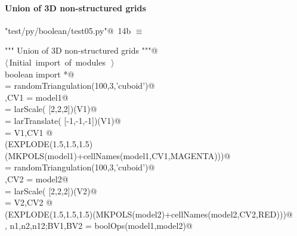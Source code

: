 \documentclass[11pt,oneside]{article}	%
\begin{document}
\paragraph{Union of 3D non-structured grids}

\begin{flushleft} \small
\begin{minipage}{\linewidth} \label{scrap23}
\protect{}\verb@"test/py/boolean/test05.py"@\nobreak\ {\footnotesize 14b }$\equiv$
\vspace{-1ex}
\begin{list}{}{} \item
\mbox{}\verb@""" Union of 3D non-structured grids """@\\
\mbox{}\verb@@\hbox{$\langle\,$Initial import of modules\nobreak\ {\footnotesize {}}$\,\rangle$}\verb@@\\
\mbox{}\verb@from boolean import *@\\
\mbox{} = randomTriangulation(100,3,'cuboid')@\\
\mbox{},CV1 = model1@\\
\mbox{} = larScale( [2,2,2])(V1)@\\
\mbox{} = larTranslate( [-1,-1,-1])(V1)@\\
\mbox{} = V1,CV1 @\\
\mbox{}\verb@VIEW(EXPLODE(1.5,1.5,1.5)(MKPOLS(model1)+cellNames(model1,CV1,MAGENTA)))@\\
\mbox{} = randomTriangulation(100,3,'cuboid')@\\
\mbox{},CV2 = model2@\\
\mbox{} = larScale( [2,2,2])(V2)@\\
\mbox{} = V2,CV2 @\\
\mbox{}\verb@VIEW(EXPLODE(1.5,1.5,1.5)(MKPOLS(model2)+cellNames(model2,CV2,RED)))@\\
\mbox{}\verb@V, n1,n2,n12;BV1,BV2 = boolOps(model1,model2)@\\
\mbox{}\verb@@{\NWsep}
\end{list}
\vspace{-2ex}
\end{minipage}\\[4ex]
\end{flushleft}
\end{document}
